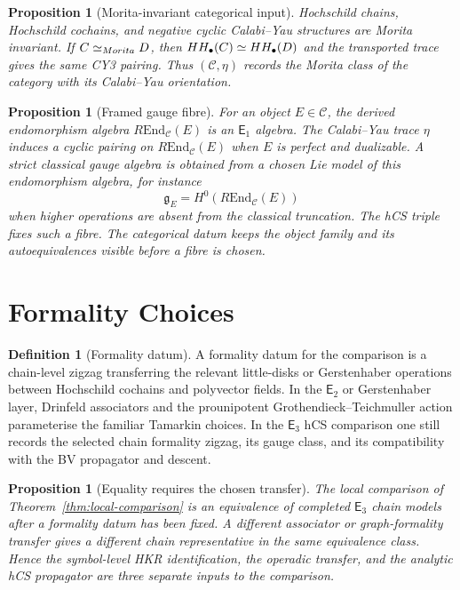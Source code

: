 \documentclass[11pt]{amsart}
\newtheorem{proposition}[theorem]{Proposition}
\theoremstyle{definition}
\newtheorem{definition}[theorem]{Definition}
\theoremstyle{remark}
\providecommand{\cC}{\mathcal{C}}
\providecommand{\Eone}{\mathsf{E}_1}
\providecommand{\Etwo}{\mathsf{E}_2}
\providecommand{\Ethree}{\mathsf{E}_3}
\providecommand{\HH}{\mathrm{HH}}
\providecommand{\End}{\mathrm{End}}
\providecommand{\fg}{\mathfrak{g}}
\begin{document}
\begin{proposition}[Morita-invariant categorical input]
\label{prop:morita}
Hochschild chains, Hochschild cochains, and negative cyclic
Calabi--Yau structures are Morita invariant.  If
$\cC\simeq_{\mathrm{Morita}}\cD$, then $\HH_\bullet(\cC)\simeq
\HH_\bullet(\cD)$ and the transported trace gives the same CY3 pairing.
Thus $(\cC,\eta)$ records the Morita class of the category with its
Calabi--Yau orientation.
\end{proposition}

\begin{proposition}[Framed gauge fibre]
\label{prop:framed-fibre}
For an object $E\in\cC$, the derived endomorphism algebra
$R\End_\cC(E)$ is an $\Eone$ algebra.  The Calabi--Yau trace $\eta$
induces a cyclic pairing on $R\End_\cC(E)$ when $E$ is perfect and
dualizable.  A strict classical gauge algebra is obtained from a chosen
Lie model of this endomorphism algebra, for instance
\[
  \fg_E=H^0(R\End_\cC(E))
\]
when higher operations are absent from the classical truncation.
The hCS triple fixes such a fibre.  The categorical datum keeps the
object family and its autoequivalences visible before a fibre is chosen.
\end{proposition}

\section{Formality Choices}

\begin{definition}[Formality datum]
\label{def:formality-datum}
A formality datum for the comparison is a chain-level zigzag transferring
the relevant little-disks or Gerstenhaber operations between Hochschild
cochains and polyvector fields.  In the $\Etwo$ or Gerstenhaber layer,
Drinfeld associators and the prounipotent Grothendieck--Teichmuller
action parameterise the familiar Tamarkin choices.  In the $\Ethree$
hCS comparison one still records the selected chain formality zigzag,
its gauge class, and its compatibility with the BV propagator and
descent.
\end{definition}

\begin{proposition}[Equality requires the chosen transfer]
\label{prop:formality-choice}
The local comparison of Theorem~\ref{thm:local-comparison} is an
equivalence of completed $\Ethree$ chain models after a formality datum
has been fixed.  A different associator or graph-formality transfer gives
a different chain representative in the same equivalence class.  Hence
the symbol-level HKR identification, the operadic transfer, and the
analytic hCS propagator are three separate inputs to the comparison.
\end{proposition}
\end{document}
